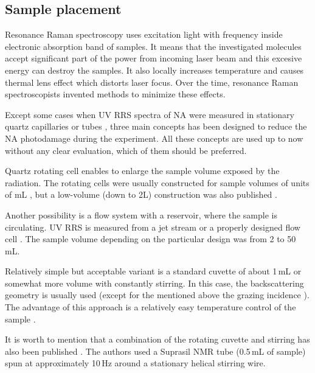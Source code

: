 \subsection{Sample placement}
\label{introduction_sample_placement}

Resonance Raman spectroscopy uses excitation light
with frequency inside electronic absorption band of samples. It means that the
investigated molecules accept significant part of the power from incoming
laser beam and this excesive energy can destroy the samples. It also locally
increases temperature and causes thermal lens effect which distorts laser
focus. Over the time, resonance Raman spectroscopists invented methods to
minimize these effects.

Except some cases when UV RRS spectra of NA were measured in stationary quartz
capillaries or tubes
\parencite{%
	Blazej1977,%
	Asher1983%
},
three main concepts has been designed to reduce the NA photodamage during the
experiment.
All these concepts are used up to now without any clear evaluation, which of
them should be preferred.

Quartz rotating cell enables to enlarge the sample volume exposed by the
radiation.
The rotating cells were usually constructed for sample volumes of units of mL
\parencite{%
	Kiefer1971,%
	Kiefer1971a,%
	Pezolet1973,%
	Nishimura1977,%
	Laigle1982a,%
	Asher1983,%
	Benson1992,%
	Toyama1993,%
	Russell1995%
},
but a low-volume (down to 2L) construction was also published
\parencite{Gfrorer1993a}.

Another possibility is a flow system with a reservoir, where the sample is
circulating.
UV RRS is measured from a jet stream
\parencite{%
	Ziegler1981,%
	Asher1983,%
	Fodor1985,%
	Russell1995,%
	Toyama1993%
}
or a properly designed flow cell
\parencite{%
	Blazej1980,%
	Gfrorer1989%
}.
The sample volume depending on the particular design was from 2 to 50\,mL.

Relatively simple but acceptable variant is a standard cuvette of about 1\,mL
or somewhat more volume with constantly stirring.
In this case, the backscattering geometry is usually used (except for the
mentioned above the grazing incidence
\parencite{Jolles1984}).
The advantage of this approach is a relatively easy temperature control of the
sample
\parencite{Mukerji1995}.

It is worth to mention that a combination of the rotating cuvette and stirring
has also been published
\parencite{Rodgers1992}.
The authors used a Suprasil NMR tube (0.5\,mL of sample) spun at approximately
10\,Hz around a stationary helical stirring wire.
